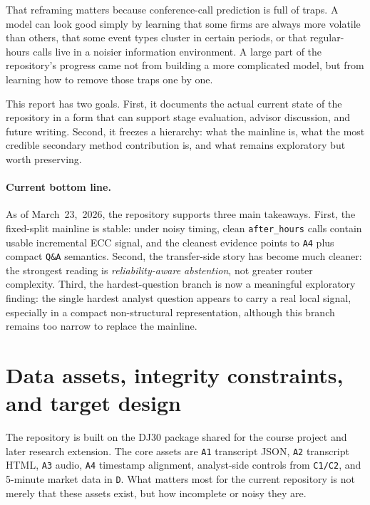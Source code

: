 \documentclass[acmsmall,screen,nonacm]{acmart}
\begin{document}
That reframing matters because conference-call prediction is full of traps. A model can look good simply by learning that some firms are always more volatile than others, that some event types cluster in certain periods, or that regular-hours calls live in a noisier information environment. A large part of the repository's progress came not from building a more complicated model, but from learning how to remove those traps one by one.

This report has two goals. First, it documents the actual current state of the repository in a form that can support stage evaluation, advisor discussion, and future writing. Second, it freezes a hierarchy: what the mainline is, what the most credible secondary method contribution is, and what remains exploratory but worth preserving.

\paragraph{Current bottom line.}
As of March~23,~2026, the repository supports three main takeaways. First, the fixed-split mainline is stable: under noisy timing, clean \texttt{after\_hours} calls contain usable incremental ECC signal, and the cleanest evidence points to \texttt{A4} plus compact \texttt{Q\&A} semantics. Second, the transfer-side story has become much cleaner: the strongest reading is \emph{reliability-aware abstention}, not greater router complexity. Third, the hardest-question branch is now a meaningful exploratory finding: the single hardest analyst question appears to carry a real local signal, especially in a compact non-structural representation, although this branch remains too narrow to replace the mainline.

\section{Data assets, integrity constraints, and target design}
The repository is built on the DJ30 package shared for the course project and later research extension. The core assets are \texttt{A1} transcript JSON, \texttt{A2} transcript HTML, \texttt{A3} audio, \texttt{A4} timestamp alignment, analyst-side controls from \texttt{C1/C2}, and 5-minute market data in \texttt{D}. What matters most for the current repository is not merely that these assets exist, but how incomplete or noisy they are.


\end{document}

